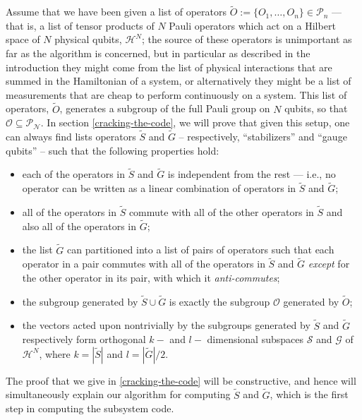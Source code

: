 \documentclass[twocolumn,showpacs,preprintnumbers,amsmath,amssymb,nofootinbib,pra,floatfix]{revtex4}
\begin{document}
Assume that we have been given a list of operators $\tilde O :=\{O_1,\dots,O_n\}\in \mathcal{P}_n$ --- that is, a list of tensor products of $N$ Pauli operators which act on a Hilbert space of $N$ physical qubits, $\mathscr{H}^N$;  the source of these operators is unimportant as far as the algorithm is concerned, but in particular as described in the introduction they might come from the list of physical interactions that are summed in the Hamiltonian of a system, or alternatively they might be a list of measurements that are cheap to perform continuously on a system.  This list of operators, $\tilde O$, generates a subgroup of the full Pauli group on $N$ qubits, so that $\mathcal{O}\subseteq\mathcal{P_N}$.  In section \ref{cracking-the-code}, we will prove that given this setup, one can always find lists operators $\tilde S$ and $\tilde G$ -- respectively, ``stabilizers'' and ``gauge qubits'' -- such that the following properties hold:
\begin{itemize}
\item each of the operators in $\tilde S$ and $\tilde G$ is independent from the rest --- i.e., no operator can be written as a linear combination of operators in $\tilde S$ and $\tilde G$;
\item all of the operators in $\tilde S$ commute with all of the other operators in $\tilde S$ and also all of the operators in $\tilde G$;
\item the list $\tilde G$ can partitioned into a list of pairs of operators such that each operator in a pair commutes with all of the operators in $\tilde S$ and $\tilde G$ \emph{except} for the other operator in its pair, with which it \emph{anti-commutes};
\item the subgroup generated by $\tilde S \cup \tilde G$ is exactly the subgroup $\mathcal{O}$ generated by $\tilde O$;
\item the vectors acted upon nontrivially by the subgroups generated by $\tilde S$ and $\tilde G$ respectively form orthogonal $k-$ and $l-$ dimensional subspaces $\mathscr{S}$ and $\mathscr{G}$ of $\mathscr{H}^N$, where $k=|\tilde S|$ and $l=|\tilde G|/2$.
\end{itemize}
The proof that we give in \ref{cracking-the-code} will be constructive, and hence will simultaneously explain our algorithm for computing $\tilde S$ and $\tilde G$, which is the first step in computing the subsystem code.
\end{document}
